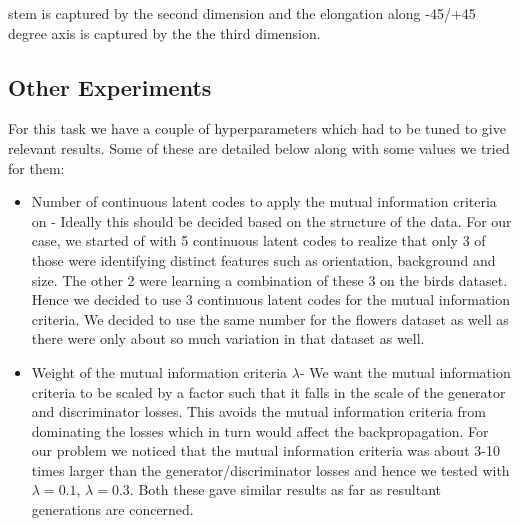 \documentclass{article}
\begin{document}
stem is captured by the second dimension and
the elongation along -45/+45 degree axis is captured by the the third dimension.

\subsection{Other Experiments}
For this task we have a couple of hyperparameters which had to be tuned to give
relevant results. Some of these are detailed below along with some values we
tried for them:
\begin{itemize}
    \item Number of continuous latent codes to apply the mutual information
        criteria on - Ideally this should be decided based on the structure of
        the data. For our case, we started of with 5 continuous latent codes to
        realize that only 3 of those were identifying distinct features such as
        orientation, background and size. The other 2 were learning a
        combination of these 3 on the birds dataset. Hence we decided to use 3
        continuous latent codes for the mutual information criteria. We decided
        to use the same number for the flowers dataset as well as there were
        only about so much variation in that dataset as well.
    \item Weight of the mutual information criteria $\lambda$- We want the
        mutual information criteria to be scaled by a factor such that it falls
        in the scale of the generator and discriminator losses. This avoids the
        mutual information criteria from dominating the losses which in turn
        would affect the backpropagation. For our problem we noticed that the
        mutual information criteria was about 3-10 times larger than the
        generator/discriminator losses and hence we tested with $\lambda = 0.1$,
        $\lambda = 0.3$. Both these gave similar results as far as resultant
        generations are concerned.
\end{itemize}
\end{document}
